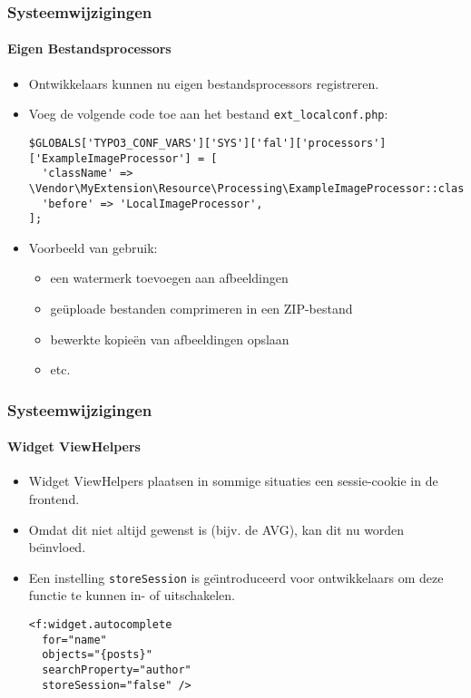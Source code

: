 
\begin{frame}[fragile]
	\frametitle{Systeemwijzigingen}
	\framesubtitle{Eigen Bestandsprocessors}

	\lstset{basicstyle=\tiny\ttfamily}

	\begin{itemize}
		\item Ontwikkelaars kunnen nu eigen bestandsprocessors registreren.
		\item Voeg de volgende code toe aan het bestand \texttt{ext\_localconf.php}:
\begin{lstlisting}
$GLOBALS['TYPO3_CONF_VARS']['SYS']['fal']['processors']['ExampleImageProcessor'] = [
  'className' => \Vendor\MyExtension\Resource\Processing\ExampleImageProcessor::class,
  'before' => 'LocalImageProcessor',
];
\end{lstlisting}

		\item Voorbeeld van gebruik:

			\begin{itemize}
				\item een watermerk toevoegen aan afbeeldingen
				\item geüploade bestanden comprimeren in een ZIP-bestand
				\item bewerkte kopieën van afbeeldingen opslaan
				\item etc.
			\end{itemize}

	\end{itemize}

\end{frame}


\begin{frame}[fragile]
	\frametitle{Systeemwijzigingen}
	\framesubtitle{Widget ViewHelpers}

	\lstset{basicstyle=\smaller\ttfamily}

	\begin{itemize}
		\item Widget ViewHelpers plaatsen in sommige situaties een sessie-cookie in de frontend.
		\item Omdat dit niet altijd gewenst is (bijv. de AVG), kan dit nu worden be\"{\i}nvloed.
		\item Een instelling \texttt{storeSession} is ge\"{\i}ntroduceerd voor ontwikkelaars om deze functie te kunnen in- of uitschakelen.
\begin{lstlisting}
<f:widget.autocomplete
  for="name"
  objects="{posts}"
  searchProperty="author"
  storeSession="false" />
\end{lstlisting}

	\end{itemize}

\end{frame}

